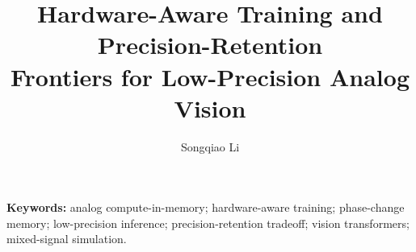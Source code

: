 \documentclass[11pt,a4paper]{article}
\title{Hardware-Aware Training and Precision-Retention\\
Frontiers for Low-Precision Analog Vision}
\author{Songqiao Li}
\date{}
\begin{document}
\maketitle



{\small\noindent\textbf{Keywords:} analog compute-in-memory; hardware-aware training; phase-change memory; low-precision inference; precision-retention tradeoff; vision transformers; mixed-signal simulation.\par}











\end{document}
